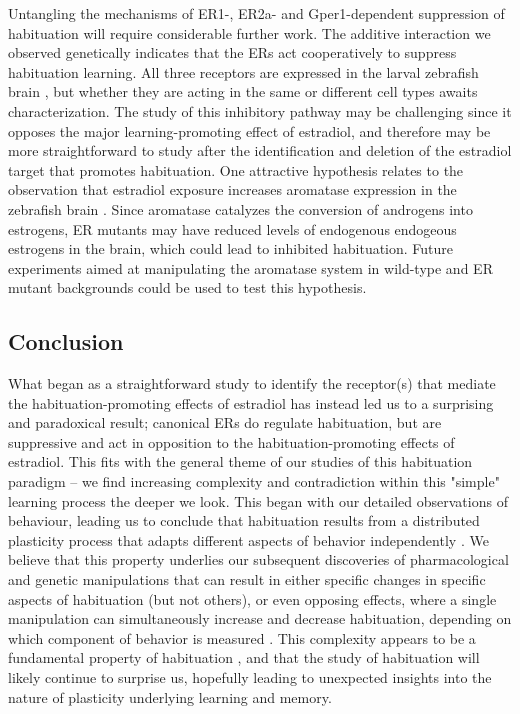 \documentclass[9.5pt,lineno]{RandlettLab_elife}
\begin{document}
{Untangling the mechanisms of ER1-, ER2a- and Gper1-dependent suppression of habituation will require considerable further work. 
The additive interaction we observed genetically indicates that the ERs act cooperatively to suppress habituation learning.
All three receptors are expressed in the larval zebrafish brain \citep{Thisse2008-vr,Romano2017-ep}, but whether they are acting in the same or different cell types awaits characterization. 
The study of this inhibitory pathway may be challenging since it opposes the major learning-promoting effect of estradiol, and therefore may be more straightforward to study after the identification and deletion of the estradiol target that promotes habituation. 
One attractive hypothesis relates to the observation that estradiol exposure increases aromatase expression in the zebrafish brain \citep{Menuet2005-hn, Hao2013-ik}. 
Since aromatase catalyzes the conversion of androgens into estrogens, ER mutants may have reduced levels of endogenous endogeous estrogens in the brain, which could lead to inhibited habituation.
Future experiments aimed at manipulating the aromatase system in wild-type and ER mutant backgrounds could be used to test this hypothesis. 

\subsection{Conclusion}

What began as a straightforward study to identify the receptor(s) that mediate the habituation-promoting effects of estradiol has instead led us to a surprising and paradoxical result; 
canonical ERs do regulate habituation, but are suppressive and act in opposition to the habituation-promoting effects of estradiol. 
This fits with the general theme of our studies of this habituation paradigm -- we find increasing complexity and contradiction within this "simple" learning process the deeper we look. 
This began with our detailed observations of behaviour, leading us to conclude that habituation results from a distributed plasticity process that adapts different aspects of behavior independently \citep{Randlett2019-fj}. 
We believe that this property underlies our subsequent discoveries of pharmacological and genetic manipulations that can result in either specific changes in specific aspects of habituation (but not others), or even opposing effects, where a single manipulation can simultaneously increase and decrease habituation, depending on which component of behavior is measured \citep{Randlett2019-fj,Lamire2023-he}.
This complexity appears to be a fundamental property of habituation \citep{McDiarmid2019-td}, and that the study of habituation will likely continue to surprise us, hopefully leading to unexpected insights into the nature of plasticity underlying learning and memory.

}
\end{document}
